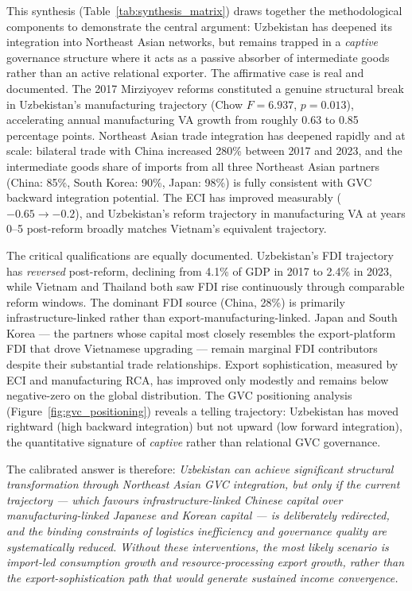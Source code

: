 This synthesis (Table~\ref{tab:synthesis_matrix}) draws together the methodological components to demonstrate the central argument: Uzbekistan has deepened its integration into Northeast Asian networks, but remains trapped in a \textit{captive} governance structure where it acts as a passive absorber of intermediate goods rather than an active relational exporter.
The affirmative case is real and documented. The 2017 Mirziyoyev reforms constituted a genuine structural break in Uzbekistan's manufacturing trajectory (Chow $F=6.937$, $p=0.013$), accelerating annual manufacturing VA growth from roughly 0.63 to 0.85 percentage points. Northeast Asian trade integration has deepened rapidly and at scale: bilateral trade with China increased 280\% between 2017 and 2023, and the intermediate goods share of imports from all three Northeast Asian partners (China: 85\%, South Korea: 90\%, Japan: 98\%) is fully consistent with GVC backward integration potential. The ECI has improved measurably ($-0.65 \to -0.2$), and Uzbekistan's reform trajectory in manufacturing VA at years 0--5 post-reform broadly matches Vietnam's equivalent trajectory.

The critical qualifications are equally documented. Uzbekistan's FDI trajectory has \textit{reversed} post-reform, declining from 4.1\% of GDP in 2017 to 2.4\% in 2023, while Vietnam and Thailand both saw FDI rise continuously through comparable reform windows. The dominant FDI source (China, 28\%) is primarily infrastructure-linked rather than export-manufacturing-linked. Japan and South Korea --- the partners whose capital most closely resembles the export-platform FDI that drove Vietnamese upgrading --- remain marginal FDI contributors despite their substantial trade relationships. Export sophistication, measured by ECI and manufacturing RCA, has improved only modestly and remains below negative-zero on the global distribution. The GVC positioning analysis (Figure~\ref{fig:gvc_positioning}) reveals a telling trajectory: Uzbekistan has moved rightward (high backward integration) but not upward (low forward integration), the quantitative signature of \textit{captive} rather than relational GVC governance.

The calibrated answer is therefore: \textit{Uzbekistan can achieve significant structural transformation through Northeast Asian GVC integration, but only if the current trajectory --- which favours infrastructure-linked Chinese capital over manufacturing-linked Japanese and Korean capital --- is deliberately redirected, and the binding constraints of logistics inefficiency and governance quality are systematically reduced. Without these interventions, the most likely scenario is import-led consumption growth and resource-processing export growth, rather than the export-sophistication path that would generate sustained income convergence.}

